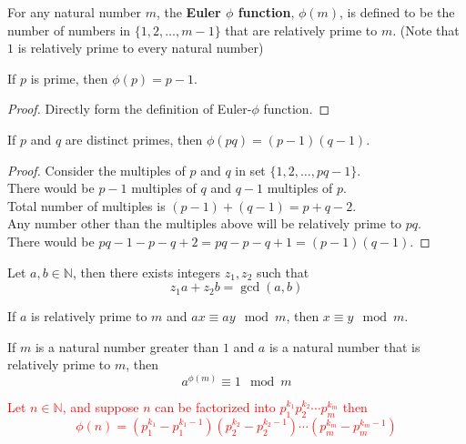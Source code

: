 \documentclass[11pt]{article}
\begin{document}
		\begin{definition}[7.2.12]
			For any natural number $m$, the \textbf{Euler $\phi$ function}, $\phi(m)$, is defined to be the number of numbers in $\{1,2,\dots,m-1\}$ that are relatively prime to $m$. (Note that $1$ is relatively prime to every natural number)
		\end{definition}
		
		\begin{theorem}[7.2.14]
			If $p$ is prime, then $\phi(p) = p-1$.
		\end{theorem}
		\begin{proof}
			Directly form the definition of Euler-$\phi$ function.
		\end{proof}
		
		\begin{theorem}[7.2.15]
			If $p$ and $q$ are distinct primes, then $\phi(pq) = (p-1)(q-1)$.
		\end{theorem}
		\begin{proof}
			Consider the multiples of $p$ and $q$ in set $\{1, 2, \dots, pq - 1\}$. \\
			There would be $p-1$ multiples of $q$ and $q-1$ multiples of $p$. \\
			Total number of multiples is $(p-1) + (q-1) = p+q-2$. \\
			Any number other than the multiples above will be relatively prime to $pq$.\\
			There would be $pq - 1 - p - q + 2 = pq - p - q + 1= (p-1)(q-1)$.  
		\end{proof}
		
		\begin{theorem}
			Let $a, b \in \mathbb{N}$, then there exists integers $z_1,z_2$ such that
			\[
				z_1 a + z_2 b = \gcd(a,b)
			\]
		\end{theorem}
		
		\begin{theorem}
			If $a$ is relatively prime to $m$ and $ax \equiv ay \mod m$, then $x \equiv y \mod m$.
		\end{theorem}
		
		\begin{theorem}
			If $m$ is a natural number greater than $1$ and $a$ is a natural number that is relatively prime to $m$, then 
			\[
				a^{\phi(m)} \equiv 1 \mod m
			\]
		\end{theorem}
		
		\textcolor{red}{
		\begin{theorem}[7.3.Q27]
			Let $n \in \mathbb{N}$, and suppose $n$ can be factorized into $p_1^{k_1} p_2^{k_2} \cdots p_m^{k_m}$ then
			\[
				\phi(n) = (p_1^{k_1} - p_1^{k_1 - 1})(p_2^{k_2} - p_2^{k_2 - 1}) \cdots (p_m^{k_m} - p_m^{k_m - 1})
			\]
		\end{theorem}
		}
	
\end{document}
